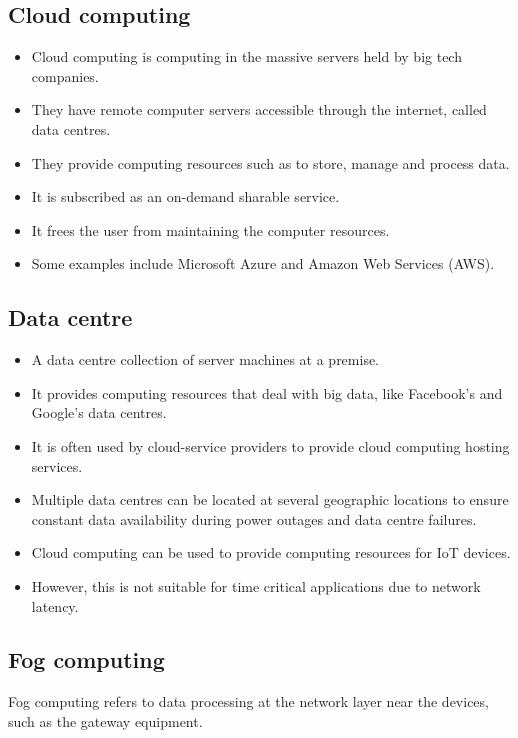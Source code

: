 \documentclass[11pt]{article}
\begin{document}
\subsection{Cloud computing}
\label{sec:orge00d189}
\begin{itemize}
\item Cloud computing is computing in the massive servers held by big tech companies.
\item They have remote computer servers accessible through the internet, called data centres.
\item They provide computing resources such as to store, manage and process data.
\item It is subscribed as an on-demand sharable service.
\item It frees the user from maintaining the computer resources.
\item Some examples include Microsoft Azure and Amazon Web Services (AWS).
\end{itemize}

\subsection{Data centre}
\label{sec:orge45bb47}
\begin{itemize}
\item A data centre collection of server machines at a premise.
\item It provides computing resources that deal with big data, like Facebook's and Google's data centres.
\item It is often used by cloud-service providers to provide cloud computing hosting services.
\item Multiple data centres can be located at several geographic locations to ensure constant data availability during power outages and data centre failures.
\item Cloud computing can be used to provide computing resources for IoT devices.
\item However, this is not suitable for time critical applications due to network latency.
\end{itemize}

\subsection{Fog computing}
\label{sec:org6bbc9e9}
Fog computing refers to data processing at the network layer near the devices, such as the gateway equipment.
\end{document}
